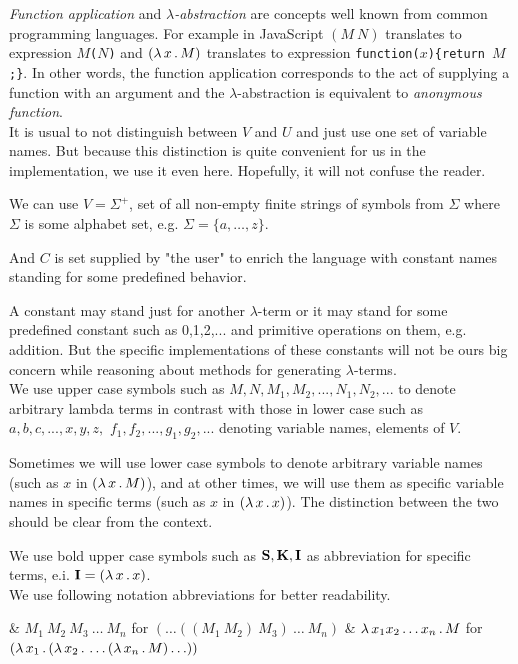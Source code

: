 \documentclass[12pt,a4paper]{report}
\newcommand{\lterm}{$\lambda$-term\xspace}
\newcommand{\lterms}{$\lambda$-terms\xspace}
\newcommand{\setDots}[2]{ 
	\lbrace #1 , \dots , #2 \rbrace
}
\begin{document}
\textit{Function application} and 
\textit{$\lambda$-abstraction} are concepts
well known from common programming languages. 
For example in JavaScript 
$(M~N)$ translates to expression \texttt{$M$($N$)} and
$( \lambda \, x \, . \, M )$ translates to expression \texttt{function($x$)\{return $M$;\}}.
In other words, the function application 
corresponds to the act of supplying a function 
with an argument and
the $\lambda$-abstraction is equivalent to 
\textit{anonymous function}. \\

It is usual to not distinguish between $V$ and $U$ and just use
one set of variable names. But because this distinction is quite convenient
for us in the implementation, we use it even here. 
Hopefully, it will not confuse the reader.
 

We can use $V = \Sigma^+$, set of all non-empty finite strings of symbols 
from $\Sigma$ where $\Sigma$ is some alphabet set, e.g.  
$
\Sigma =
\setDots{a}{z}$.

And $C$ is set supplied by "the user" to enrich 
the language with constant names standing
for some predefined behavior.

A constant may stand just for another \lterm
or it may stand for some predefined constant 
such as 0,1,2,... and primitive operations on
them, e.g. addition. 
But the specific implementations 
of these constants will not be ours big concern 
while reasoning about methods for generating 
\lterms .\\

We use upper case symbols such as 
$M,N,M_1,M_2,...,N_1,N_2,...$
to denote arbitrary lambda terms in contrast with
those in lower case such as
$a,b,c,...,x,y,z,$
$f_1,f_2,...,g_1,g_2,...$
denoting variable names, elements of $V$.

Sometimes we will use lower case symbols
to denote arbitrary variable names (such as
$x$ in $( \lambda \, x \, . \, M )$),
and at other times, we will use them
as specific variable names in specific terms 
(such as $x$ in $( \lambda \, x \, . \, x )$).
The distinction between the two should be
clear from the context.

We use bold upper case symbols such as 
$\mathbf{S}, \mathbf{K}, \mathbf{I}$ as abbreviation
for specific terms, e.i. 
$\mathbf{I} = ( \lambda \, x \, . \, x )$.  
\\[1em]

We use following notation
abbreviations for better readability. \vspace{3mm}

\begin{easylist}[enumerate]
& $M_1~M_2~M_3~\dots~M_n$ for 
  $(\dots((M_1~M_2)~M_3)~\dots~M_n)$ 
& $\lambda \, x_1 x_2 \dots x_n  \, . \, M$ for
  $\lamb{x_1}{\lamb{x_2}{\dots\lamb{x_n}{M}\dots}}$
\end{easylist}~
  
\end{document}
